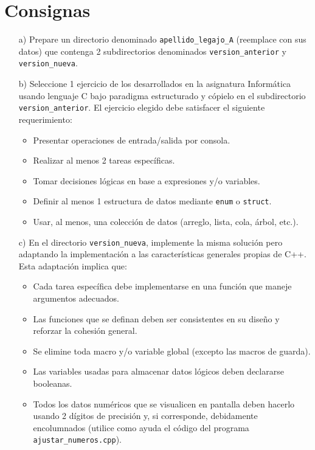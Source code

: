\documentclass[a4paper,12pt]{article}
\begin{document}
\section{Consignas}
\begin{itemize}
    \item[a)] Prepare un directorio denominado \texttt{apellido\_legajo\_A} (reemplace con sus datos) que contenga
    2 subdirectorios denominados \texttt{version\_anterior} y \texttt{version\_nueva}.
    
    \item[b)] Seleccione 1 ejercicio de los desarrollados en la asignatura Informática usando lenguaje C
    bajo paradigma estructurado y cópielo en el subdirectorio \texttt{version\_anterior}. El ejercicio elegido
    debe satisfacer el siguiente requerimiento:
    \begin{itemize}
        \item Presentar operaciones de entrada/salida por consola.
        \item Realizar al menos 2 tareas específicas.
        \item Tomar decisiones lógicas en base a expresiones y/o variables.
        \item Definir al menos 1 estructura de datos mediante \texttt{enum} o \texttt{struct}.
        \item Usar, al menos, una colección de datos (arreglo, lista, cola, árbol, etc.).
    \end{itemize}
    
    \item[c)] En el directorio \texttt{version\_nueva}, implemente la misma solución pero adaptando la
    implementación a las características generales propias de C++. Esta adaptación implica que:
    \begin{itemize}
        \item Cada tarea específica debe implementarse en una función que maneje argumentos adecuados.
        \item Las funciones que se definan deben ser consistentes en su diseño y reforzar la cohesión general.
        \item Se elimine toda macro y/o variable global (excepto las macros de guarda).
        \item Las variables usadas para almacenar datos lógicos deben declararse booleanas.
        \item Todos los datos numéricos que se visualicen en pantalla deben hacerlo usando 2 dígitos de precisión y, si corresponde, debidamente encolumnados (utilice como ayuda el código del programa \texttt{ajustar\_numeros.cpp}).
    \end{itemize}
    

\end{itemize}
\end{document}
